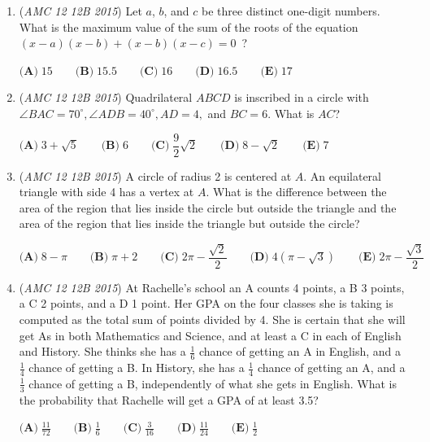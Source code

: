 \begin{enumerate}
 $\textbf{(A)}\; 20 \qquad\textbf{(B)}\; \dfrac{360}{17} \qquad\textbf{(C)}\; \dfrac{107}{5} \qquad\textbf{(D)}\; \dfrac{43}{2} \qquad\textbf{(E)}\; \dfrac{281}{13}$


	\item (\textit{AMC 12 12B 2015}) Let $a$, $b$, and $c$ be three distinct one-digit numbers. What is the maximum value of the sum of the roots of the equation $(x-a)(x-b)+(x-b)(x-c)=0$ ?


 $\textbf{(A)}\; 15 \qquad\textbf{(B)}\; 15.5 \qquad\textbf{(C)}\; 16 \qquad\textbf{(D)}\; 16.5 \qquad\textbf{(E)}\; 17$


	\item (\textit{AMC 12 12B 2015}) Quadrilateral $ABCD$ is inscribed in a circle with $\angle BAC=70^{\circ}, \angle ADB=40^{\circ}, AD=4,$ and $BC=6$. What is $AC$?


 $\textbf{(A)}\; 3+\sqrt{5} \qquad\textbf{(B)}\; 6 \qquad\textbf{(C)}\; \dfrac{9}{2}\sqrt{2} \qquad\textbf{(D)}\; 8-\sqrt{2} \qquad\textbf{(E)}\; 7$


	\item (\textit{AMC 12 12B 2015}) A circle of radius 2 is centered at $A$. An equilateral triangle with side 4 has a vertex at $A$. What is the difference between the area of the region that lies inside the circle but outside the triangle and the area of the region that lies inside the triangle but outside the circle?


 $\textbf{(A)}\; 8-\pi \qquad\textbf{(B)}\; \pi+2 \qquad\textbf{(C)}\; 2\pi-\dfrac{\sqrt{2}}{2} \qquad\textbf{(D)}\; 4(\pi-\sqrt{3}) \qquad\textbf{(E)}\; 2\pi-\dfrac{\sqrt{3}}{2}$


	\item (\textit{AMC 12 12B 2015}) At Rachelle's school an A counts 4 points, a B 3 points, a C 2 points, and a D 1 point. Her GPA on the four classes she is taking is computed as the total sum of points divided by 4. She is certain that she will get As in both Mathematics and Science, and at least a C in each of English and History. She thinks she has a $\frac{1}{6}$ chance of getting an A in English, and a $\frac{1}{4}$ chance of getting a B. In History, she has a $\frac{1}{4}$ chance of getting an A, and a $\frac{1}{3}$ chance of getting a B, independently of what she gets in English. What is the probability that Rachelle will get a GPA of at least 3.5?


 $\textbf{(A)}\; \frac{11}{72} \qquad\textbf{(B)}\; \frac{1}{6} \qquad\textbf{(C)}\; \frac{3}{16} \qquad\textbf{(D)}\; \frac{11}{24} \qquad\textbf{(E)}\; \frac{1}{2}$



\end{enumerate}
